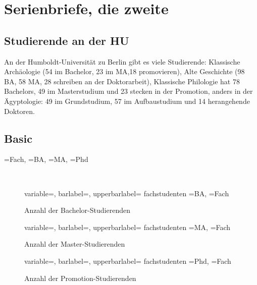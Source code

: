 
\chapter{Serienbriefe, die zweite}

\section{Studierende an der HU}

An der Humboldt-Universität zu Berlin gibt es viele Studierende:
Klassische Archäologie (54 im Bachelor, 23 im MA,18 promovieren), 
Alte Geschichte (98 BA, 58 MA, 28 schreiben an der Doktorarbeit),
Klassische Philologie hat 78 Bachelors, 49 im Masterstudium und 23 stecken in der Promotion,
anders in der Ägyptologie: 49 im Grundstudium, 57 im Aufbaustudium und 14 herangehende Doktoren.

\section{Basic}


{\fach=Fach,%
 \ba=BA,%
 \ma=MA,%
 \phd=Phd%
}%
{\begin{description}
  \item[\large\fach]~%
\end{description}%
}

\begin{figure}[h]
\DTLbarchart%
  {variable=\ba,%
  barlabel=\fach,
  upperbarlabel=\ba}
  {fachstudenten}%
  {\ba=BA,%
  \fach=Fach}
\caption{Anzahl der Bachelor-Studierenden}
\end{figure}

\begin{figure}[h]
	\DTLbarchart%
	{variable=\ma,%
		barlabel=\fach,
		upperbarlabel=\ma}
	{fachstudenten}%
	{\ma=MA,%
		\fach=Fach}
	\caption{Anzahl der Master-Studierenden}
\end{figure}

\begin{figure}[h]
	\DTLbarchart%
	{variable=\phd,%
		barlabel=\fach,
		upperbarlabel=\phd}
	{fachstudenten}%
	{\phd=Phd,%
		\fach=Fach}
	\caption{Anzahl der Promotion-Studierenden}
\end{figure}

